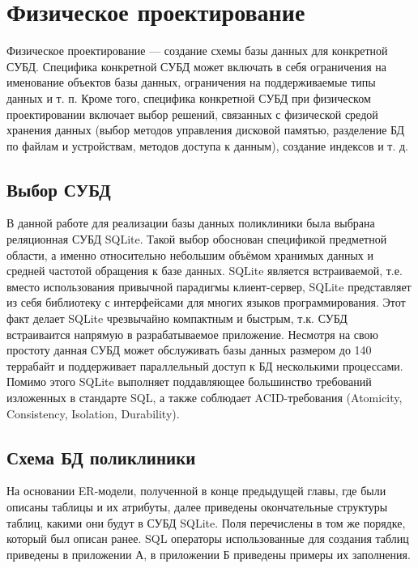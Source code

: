 \documentclass[14pt,a4paper,russian]{extreport}
\begin{document}
\chapter{Физическое проектирование}
Физическое проектирование — создание схемы базы данных для конкретной СУБД. Специфика конкретной
СУБД может включать в себя ограничения на именование объектов базы данных, ограничения на
поддерживаемые типы данных и т. п. Кроме того, специфика конкретной СУБД при физическом
проектировании включает выбор решений, связанных с физической средой хранения данных (выбор методов
управления дисковой памятью, разделение БД по файлам и устройствам, методов доступа к данным),
создание индексов и т. д.\cite{dbdesign} 


\section{Выбор СУБД}
В данной работе для реализации базы данных поликлиники была выбрана реляционная СУБД
SQLite. Такой выбор обоснован спецификой предметной области, а именно относительно небольшим
объёмом хранимых данных и средней частотой обращения к базе данных. SQLite является
встраиваемой, т.е. вместо использования привычной парадигмы клиент-сервер, SQLite представляет из
себя библиотеку с интерфейсами для многих языков программирования. Этот факт делает SQLite
чрезвычайно компактным и быстрым, т.к. СУБД встраиваится напрямую в разрабатываемое приложение.
Несмотря на свою простоту данная СУБД может обслуживать базы данных размером до 140 террабайт и
поддерживает параллельный доступ к БД несколькими процессами. Помимо этого SQLite выполняет
поддавляющее большинство требований изложенных в стандарте SQL, а также соблюдает ACID-требования
(Atomicity, Consistency, Isolation, Durability).\cite{sqlite}


\section{Схема БД поликлиники}
На основании ER-модели, полученной в конце предыдущей главы, где были описаны таблицы и их атрибуты,
далее приведены окончательные структуры таблиц, какими они будут в СУБД SQLite. Поля перечислены в
том же порядке, который был описан ранее. SQL операторы
использованные для создания таблиц приведены в приложении А, в приложении Б приведены примеры их
заполнения.
\setcounter{lstlisting}{0}
\end{document}
